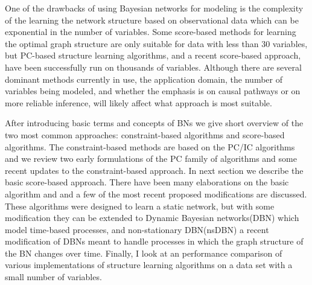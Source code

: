     One of the drawbacks of using Bayesian networks 
    for modeling is the complexity of the learning the network
    structure based on observational data which
    can be exponential in the number of variables. Some score-based
    methods for learning the optimal graph structure 
     are only suitable for data with less
    than 30 variables, but PC-based structure learning
    algorithms, and a recent score-based approach,
     have been successfully run on thousands
    of variables. Although there are several dominant
    methods currently in use, the application domain, 
    the number of variables being modeled, and whether
    the emphasis is on causal pathways or on more
    reliable inference, will likely affect what approach
    is most suitable.

    After introducing basic terms and concepts of BNs 
    we give short overview of the two 
    most common approaches: constraint-based algorithms
    and score-based algorithms. The constraint-based methods are based 
    on the PC/IC algorithms and we review two early 
    formulations of the PC family of algorithms
    and some recent updates to the
    constraint-based approach.  In next section
    we describe the basic score-based approach. There have 
    been many elaborations on the basic algorithm and
    and a few of the most recent proposed modifications are
    discussed. These algorithms were designed to learn
    a static network, but with some modification they can
    be extended to Dynamic Bayesian networks(DBN) which model
    time-based processes, and non-stationary DBN(nsDBN)
    a recent modification of DBNs meant to handle processes in
    which the graph structure of the BN changes over time.
    Finally, I look at an performance comparison of 
    various implementations of structure learning algorithms
    on a data set with a small number of variables.




